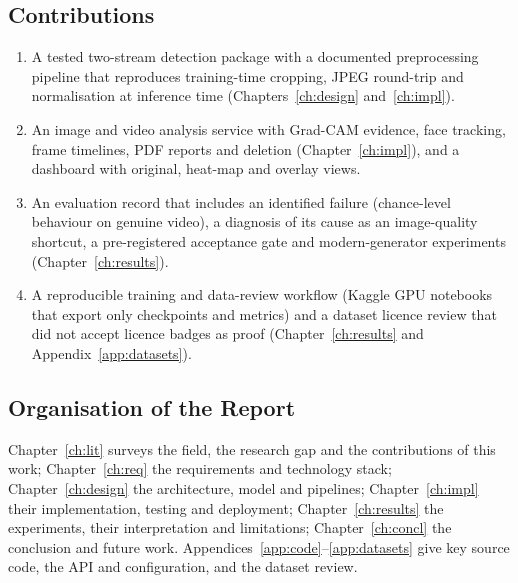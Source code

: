 \subsection{Contributions}
\begin{enumerate}
\item A tested two-stream detection package with a documented preprocessing pipeline that reproduces training-time cropping, JPEG
round-trip and normalisation at inference time (Chapters~\ref{ch:design} and~\ref{ch:impl}).
\item An image and video analysis service with Grad-CAM evidence, face tracking, frame timelines, PDF reports and deletion
(Chapter~\ref{ch:impl}), and a dashboard with original, heat-map and overlay views.
\item An evaluation record that includes an identified failure (chance-level behaviour on genuine video), a diagnosis of its cause as an
image-quality shortcut, a pre-registered acceptance gate and modern-generator experiments (Chapter~\ref{ch:results}).
\item A reproducible training and data-review workflow (Kaggle GPU notebooks that export only checkpoints and metrics) and a dataset
licence review that did not accept licence badges as proof (Chapter~\ref{ch:results} and Appendix~\ref{app:datasets}).
\end{enumerate}

\subsection{Organisation of the Report}
Chapter~\ref{ch:lit} surveys the field, the research gap and the contributions of this work; Chapter~\ref{ch:req} the requirements and technology stack;
Chapter~\ref{ch:design} the architecture, model and pipelines; Chapter~\ref{ch:impl} their implementation, testing and deployment;
Chapter~\ref{ch:results} the experiments, their interpretation and limitations; Chapter~\ref{ch:concl} the conclusion and future work.
Appendices~\ref{app:code}--\ref{app:datasets} give key source code, the API and configuration, and the dataset review.

